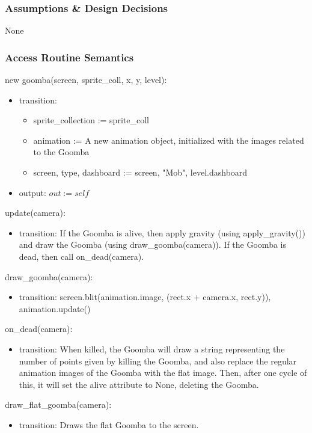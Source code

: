 \documentclass[12pt]{article}
\begin{document}
\subsubsection* {Assumptions \& Design Decisions}

None

\subsubsection* {Access Routine Semantics}

new goomba(screen, sprite\_coll, x, y, level):
\begin{itemize}
    \item transition: 
    \begin{itemize}[]
        \item sprite\_collection := sprite\_coll
        \item animation := A new animation object, initialized with the images related to the Goomba
        \item screen, type, dashboard := screen, "Mob", level.dashboard
    \end{itemize}
    \item output: $out := self$
\end{itemize}

update(camera):
\begin{itemize}
    \item transition: If the Goomba is alive, then apply gravity (using apply\_gravity()) and draw the Goomba (using draw\_goomba(camera)). If the Goomba is dead, then call on\_dead(camera).
\end{itemize}

draw\_goomba(camera):
\begin{itemize}
    \item transition: screen.blit(animation.image, (rect.x + camera.x, rect.y)), animation.update()
\end{itemize}

on\_dead(camera):
\begin{itemize}
    \item transition: When killed, the Goomba will draw a string representing the number of points given by killing the Goomba, and also replace the regular animation images of the Goomba with the flat image. Then, after one cycle of this, it will set the alive attribute to None, deleting the Goomba.
\end{itemize}

draw\_flat\_goomba(camera):
\begin{itemize}
    \item transition: Draws the flat Goomba to the screen.
\end{itemize}
\end{document}
